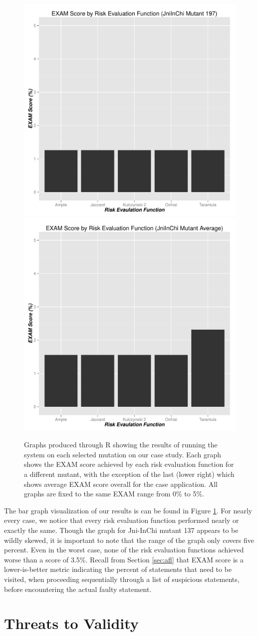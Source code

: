 \begin{figure}[tb]
\includegraphics[width=0.4\linewidth]{img/graph_197.pdf}
\hspace{0.1\linewidth}
\includegraphics[width=0.4\linewidth]{img/graph_avg.pdf}

\caption{Graphs produced through R showing the results of running
the system on each selected mutation on our case study.  Each graph
shows the EXAM score achieved by each risk evaluation function for a
different mutant, with the exception of the last (lower right) which
shows average EXAM score overall for the case application.  All graphs
are fixed to the same EXAM range from 0\% to 5\%.}
\label{fig:results}
\end{figure}

The bar graph visualization of our results is can be found in Figure \ref{fig:results}.  For nearly every case, 
we notice that every risk evaluation function performed nearly or exactly the same.  Though the 
graph for Jni-InChi mutant 137 appears to be wildly skewed, it is important to note that the range of the
graph only covers five percent.  Even in the worst case, none of the risk evaluation functions achieved
worse than a score of 3.5\%.  Recall from Section \ref{sec:afl} that EXAM score is a lower-is-better metric
indicating the percent of statements that need to be visited, when proceeding sequentially through a 
list of suspicious statements, before encountering the actual faulty statement.


\section{Threats to Validity}\label{sec:valid}

